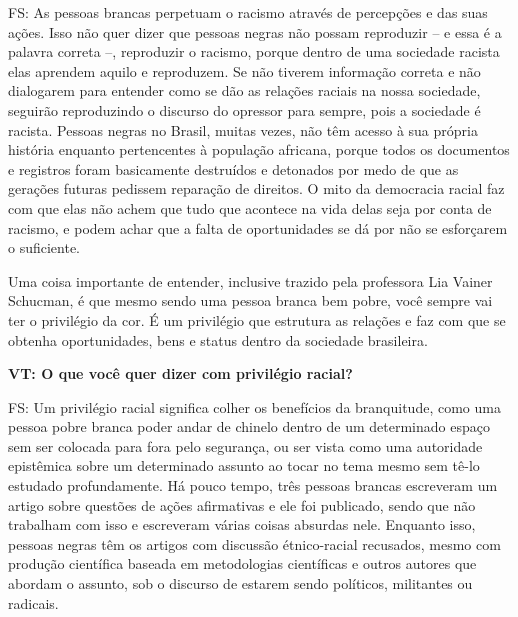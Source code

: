 \documentclass[a4paper,
fontsize=11pt,
oneside,
numbers=noperiodatend,
parskip=half-,
bibliography=totoc,
final
]{scrartcl}
\begin{document}
FS: As pessoas brancas perpetuam o racismo através de percepções e das
suas ações. Isso não quer dizer que pessoas negras não possam reproduzir
-- e essa é a palavra correta --, reproduzir o racismo, porque dentro de
uma sociedade racista elas aprendem aquilo e reproduzem. Se não tiverem
informação correta e não dialogarem para entender como se dão as
relações raciais na nossa sociedade, seguirão reproduzindo o discurso do
opressor para sempre, pois a sociedade é racista. Pessoas negras no
Brasil, muitas vezes, não têm acesso à sua própria história enquanto
pertencentes à população africana, porque todos os documentos e
registros foram basicamente destruídos e detonados por medo de que as
gerações futuras pedissem reparação de direitos. O mito da democracia
racial faz com que elas não achem que tudo que acontece na vida delas
seja por conta de racismo, e podem achar que a falta de oportunidades se
dá por não se esforçarem o suficiente.

Uma coisa importante de entender, inclusive trazido pela professora Lia
Vainer Schucman, é que mesmo sendo uma pessoa branca bem pobre, você
sempre vai ter o privilégio da cor. É um privilégio que estrutura as
relações e faz com que se obtenha oportunidades, bens e status dentro da
sociedade brasileira.

\textbf{VT: O que você quer dizer com privilégio racial?}

FS: Um privilégio racial significa colher os benefícios da branquitude,
como uma pessoa pobre branca poder andar de chinelo dentro de um
determinado espaço sem ser colocada para fora pelo segurança, ou ser
vista como uma autoridade epistêmica sobre um determinado assunto ao
tocar no tema mesmo sem tê-lo estudado profundamente. Há pouco tempo,
três pessoas brancas escreveram um artigo sobre questões de ações
afirmativas e ele foi publicado, sendo que não trabalham com isso e
escreveram várias coisas absurdas nele. Enquanto isso, pessoas negras
têm os artigos com discussão étnico-racial recusados, mesmo com produção
científica baseada em metodologias científicas e outros autores que
abordam o assunto, sob o discurso de estarem sendo políticos, militantes
ou radicais.
\end{document}
